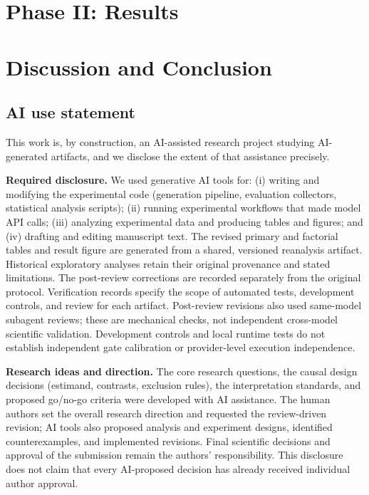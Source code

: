 \documentclass{article}
\begin{document}
\section{Phase II: Results}\label{sec:results}


\section{Discussion and Conclusion}\label{sec:discussion}




\label{endofmain}

\subsection*{AI use statement}

This work is, by construction, an AI-assisted research project studying
AI-generated artifacts, and we disclose the extent of that assistance precisely.

\textbf{Required disclosure.} We used generative AI tools for: (i) writing and
modifying the experimental code (generation pipeline, evaluation collectors,
statistical analysis scripts); (ii) running experimental workflows that
made model API calls; (iii) analyzing experimental data and
producing tables and figures; and (iv) drafting and editing manuscript text.
The revised primary and factorial tables and result figure are generated
from a shared, versioned reanalysis artifact. Historical exploratory analyses
retain their original provenance and stated limitations. The post-review
corrections are recorded separately from the original protocol.
Verification records specify the scope of automated tests, development
controls, and review for each artifact. Post-review revisions also used
same-model subagent reviews; these are mechanical checks, not independent
cross-model scientific validation. Development controls and local runtime
tests do not establish independent gate calibration or provider-level
execution independence.

\textbf{Research ideas and direction.} The core research questions, the causal
design decisions (estimand, contrasts, exclusion rules), the interpretation
standards, and proposed go/no-go criteria were developed with AI assistance.
The human authors set the overall research direction and requested the
review-driven revision; AI tools also proposed analysis and experiment
designs, identified counterexamples, and implemented revisions. Final
scientific decisions and approval of the submission remain the authors'
responsibility. This disclosure does not claim that every AI-proposed
decision has already received individual author approval.
\end{document}
